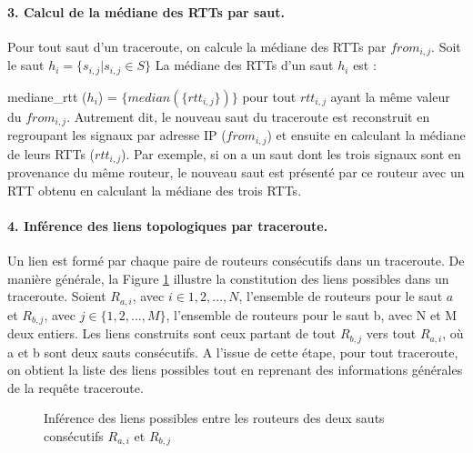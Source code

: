 \paragraph{3. Calcul de la médiane des RTTs par saut.} Pour tout saut d'un traceroute,  on calcule la médiane des RTTs par $from_{i,j}$. Soit le saut $h_i =\{s_{i,j} |  s_{i,j} \in S  \}$
La médiane des RTTs d'un saut $h_i$ est  :

mediane\_rtt ($h_i$) =  $\{median(\{rtt_{i, j}  \})\}$
pour tout  $rtt_{i, j} $ ayant  la même valeur du $ from_{i, j} $. Autrement dit, le nouveau saut du traceroute est reconstruit en regroupant les signaux par adresse IP ($ from_{i, j} $) et ensuite en calculant la médiane de leurs RTTs ($rtt_{i,j}$). Par exemple, si on a un saut dont les trois signaux sont en provenance du même routeur, le nouveau saut est présenté par ce routeur avec un RTT obtenu en calculant la médiane des trois RTTs.




\paragraph{4. Inférence des liens topologiques par traceroute.} Un lien  est formé par chaque paire de routeurs consécutifs dans un traceroute. De manière générale, la Figure \ref{fig:link-inference} illustre la constitution des liens possibles  dans un traceroute. Soient  $R_{a,i}$, avec $i \in {1,2, ...,N}$,  l'ensemble de routeurs pour le saut $a$ et $R_{b,j}$, avec $j \in \{1,2, ..., M\}$, l'ensemble  de routeurs pour le saut b, avec N et M deux entiers. Les liens  construits sont ceux partant de tout $R_{b,j}$ vers tout $R_{a,i}$, où a et b sont deux sauts consécutifs. A l'issue de cette étape, pour tout traceroute, on obtient la liste des liens possibles tout en reprenant des informations générales de la requête traceroute.
\begin{figure}[H]
	\centering
	\captionsetup{justification=centering}
	\resizebox{0.4\textwidth}{!}{
	
}
	\caption{Inférence des liens possibles entre les routeurs des deux sauts consécutifs $R_{a,i}$ et $R_{b,j}$}
	\label{fig:link-inference}
\end{figure}

